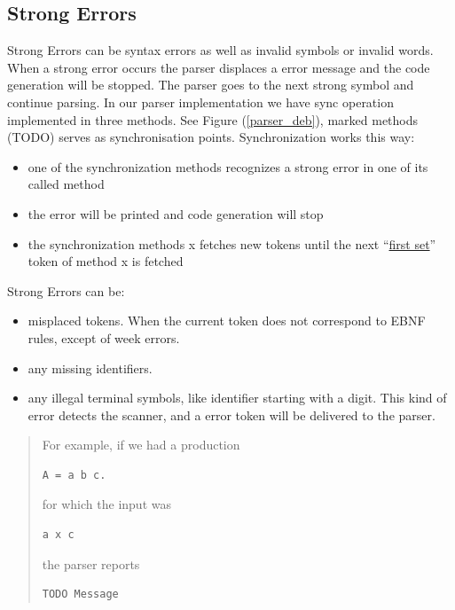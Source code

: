 \subsection{Strong Errors}
\label{label_strong_errors}
Strong Errors can be syntax errors as well as invalid symbols or invalid words. When a strong error occurs the parser displaces a error
message and the code generation will be stopped. The parser goes to the next strong symbol and continue parsing. In our parser
implementation we have sync operation implemented in three methods. See Figure (\ref{parser_deb}), marked methods (TODO) serves as
synchronisation points. Synchronization works this way:
\begin{itemize}
  \item one of the synchronization methods recognizes a strong error in one of its called method
  \item the error will be printed and code generation will stop
  \item the synchronization methods x fetches new tokens until the next ``\hyperref[first_sets]{first set}'' token of method x is fetched
\end{itemize}
Strong Errors can be:
\begin{itemize}
  \item misplaced tokens. When the current token does not correspond to EBNF rules, except of week errors.
  \item any missing identifiers.
  \item any illegal terminal symbols, like identifier starting with a digit. This kind of error detects the scanner, and a
  error token will be delivered to the parser.
\end{itemize}
\begin{quote}
For example, if we had a production
\begin{verbatim}
A = a b c.
\end{verbatim}
for which the input was
\begin{verbatim}
a x c
\end{verbatim}
the parser reports
\begin{verbatim}
TODO Message
\end{verbatim}
\end{quote}
